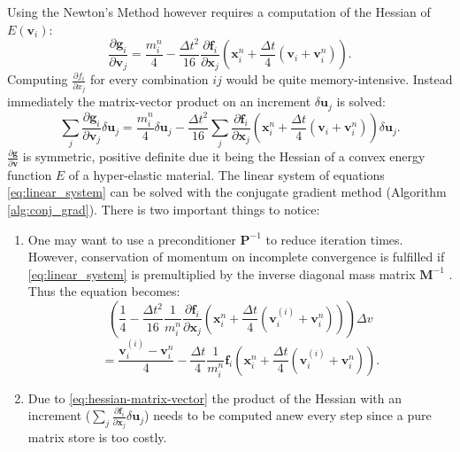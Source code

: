 \documentclass[m,times]{cgMA}
\begin{document}
Using the Newton's Method however requires a computation of the Hessian of $E(\boldsymbol{v}_i)$:
\begin{equation}
  \frac{\partial \boldsymbol{g}_i}{\partial \boldsymbol{v}_j} = \frac{m_i^n}{4} - \frac{\Delta t^2}{16}\frac{\partial \boldsymbol{f}_i}{\partial \boldsymbol{x}_j}\left(\boldsymbol{x}_i^n + \frac{\Delta t}{4} (\boldsymbol{v}_i + \boldsymbol{v}_i^{n})\right).
\end{equation}
Computing $\frac{\partial f_i}{\partial x_j}$ for every combination $ij$ would be quite memory-intensive. Instead immediately the matrix-vector product on an increment $\delta \boldsymbol{u}_j$ is solved:
\begin{equation}\label{eq:hessian-matrix-vector}
  \sum_j\frac{\partial \boldsymbol{g}_i}{\partial \boldsymbol{v}_j}\delta \boldsymbol{u}_j = \frac{m_i^n}{4}\delta \boldsymbol{u}_j - \frac{\Delta t^2}{16}\sum_j \frac{\partial \boldsymbol{f}_i}{\partial \boldsymbol{x}_j}\left(\boldsymbol{x}_i^n + \frac{\Delta t}{4} (\boldsymbol{v}_i + \boldsymbol{v}_i^{n})\right) \delta \boldsymbol{u}_j.
\end{equation}
$\frac{\partial \boldsymbol{g}}{\partial \boldsymbol{v}}$ is symmetric, positive definite due it being the Hessian of a convex energy function $E$ of a hyper-elastic material.
The linear system of equations \ref{eq:linear_system} can be solved with the conjugate gradient method (Algorithm \ref{alg:conj_grad}). There is two important things to notice:
\begin{enumerate}
  \item  One may want to use a preconditioner $\boldsymbol{P}^{-1}$ to reduce iteration times. However, conservation of momentum on incomplete convergence is fulfilled if \ref{eq:linear_system} is premultiplied by the inverse diagonal mass matrix $\boldsymbol{M}^{-1}$ \cite{MPM:APIC}. Thus the equation becomes:
    $$
      \left(\frac{1}{4} - \frac{\Delta t^2}{16}\frac{1}{m_i^n}\frac{\partial \boldsymbol{f}_i}{\partial \boldsymbol{x}_j}\left(\boldsymbol{x}_i^n + \frac{\Delta t}{4} (\boldsymbol{v}^{(i)}_i + \boldsymbol{v}_i^{n})\right)\right) \Delta v
      $$
    \begin{equation}
      = \frac{\boldsymbol{v}_i^{(i)}-\boldsymbol{v}_i^n}{4} -\frac{\Delta t}{4}\frac{1}{m_i^n}\boldsymbol{f}_i\left(\boldsymbol{x}_i^n + \frac{\Delta t}{4} (\boldsymbol{v}^{(i)}_i + \boldsymbol{v}_i^{n})\right).
    \end{equation}
  \item Due to \ref{eq:hessian-matrix-vector} the product of the Hessian with an increment ($\sum_j \frac{\partial \boldsymbol{f}_i}{\partial \boldsymbol{x}_j} \delta \boldsymbol{u}_j$) needs to be computed anew every step since a pure matrix store is too costly.
\end{enumerate}
\end{document}
